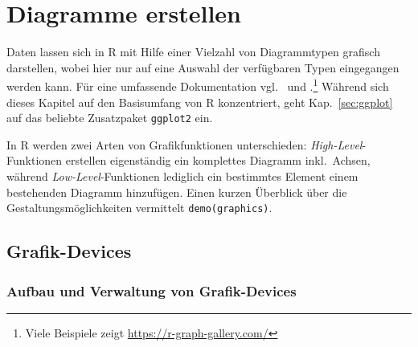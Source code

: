 \chapter{Diagramme erstellen}
\label{sec:graphics}

Daten lassen sich in R mit Hilfe einer Vielzahl von Diagrammtypen grafisch darstellen, wobei hier nur auf eine Auswahl der verfügbaren Typen eingegangen werden kann. Für eine umfassende Dokumentation vgl.\  und .\footnote{Viele Beispiele zeigt \url{https://r-graph-gallery.com/}} Während sich dieses Kapitel auf den Basisumfang von R konzentriert, geht Kap.\ \ref{sec:ggplot} auf das beliebte Zusatzpaket \lstinline!ggplot2! ein.

In R werden zwei Arten von Grafikfunktionen unterschieden: \emph{High-Level}-Funktionen erstellen eigenständig ein komplettes Diagramm inkl.\ Achsen, während \emph{Low-Level}-Funktionen lediglich ein bestimmtes Element einem bestehenden Diagramm hinzufügen. Einen kurzen Überblick über die Gestaltungsmöglichkeiten vermittelt \lstinline!demo(graphics)!.

\section{Grafik-Devices}

\subsection{Aufbau und Verwaltung von Grafik-Devices}
\label{sec:device}

